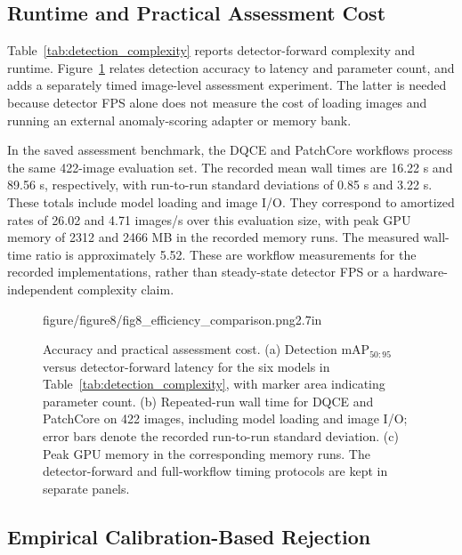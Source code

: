 \subsection{Runtime and Practical Assessment Cost}
\label{subsec:runtime_analysis}

Table~\ref{tab:detection_complexity} reports detector-forward complexity
and runtime. Figure~\ref{fig:efficiency} relates detection accuracy to
latency and parameter count, and adds a separately timed image-level
assessment experiment. The latter is needed because detector FPS alone
does not measure the cost of loading images and running an external
anomaly-scoring adapter or memory bank.

In the saved assessment benchmark, the DQCE and PatchCore workflows process
the same 422-image evaluation set. The recorded mean wall times are 16.22 s
and 89.56 s, respectively, with run-to-run standard deviations of 0.85 s
and 3.22 s. These totals include model loading and image I/O. They correspond
to amortized rates of 26.02 and 4.71 images/s over this evaluation size,
with peak GPU memory of 2312 and 2466 MB in the recorded memory runs.
The measured wall-time ratio is approximately 5.52. These are workflow
measurements for the recorded implementations, rather than steady-state
detector FPS or a hardware-independent complexity claim.

\begin{figure}[!t]
  \centering
    {figure/figure8/fig8_efficiency_comparison.png}{2.7in}
  \caption{Accuracy and practical assessment cost. (a) Detection
  mAP$_{50:95}$ versus detector-forward latency for the six models in
  Table~\ref{tab:detection_complexity}, with marker area indicating parameter
  count. (b) Repeated-run wall time for DQCE and PatchCore on 422 images,
  including model loading and image I/O; error bars denote the recorded
  run-to-run standard deviation. (c) Peak GPU memory in the corresponding
  memory runs. The detector-forward and full-workflow timing protocols
  are kept in separate panels.}
  \label{fig:efficiency}
\end{figure}

\subsection{Empirical Calibration-Based Rejection}
\label{subsec:selective_results}

